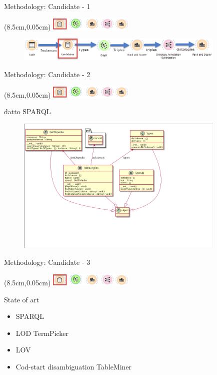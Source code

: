 \documentclass{beamer}
\begin{document}
\begin{frame}{Methodology: Candidate - 1}
	\begin{textblock*}{4cm}(8.5cm,0.05cm) %
		\includegraphics[width=4cm]{images/header-candidate.png}
	\end{textblock*}
	\begin{figure}
		\includegraphics[width=10cm]{images/diagrams-candidate.png}
	\end{figure}
\end{frame}
\begin{frame}{Methodology: Candidate - 2}
	\begin{textblock*}{4cm}(8.5cm,0.05cm) %
		\includegraphics[width=4cm]{images/header-candidate.png}
	\end{textblock*}
	\begin{definition}
		datto SPARQL
	\end{definition}
	\begin{figure}
		\includegraphics[width=10cm]{images/uml-types-diagram.png}
	\end{figure}
\end{frame}
\begin{frame}{Methodology: Candidate - 3}
	\begin{textblock*}{4cm}(8.5cm,0.05cm) %
		\includegraphics[width=4cm]{images/header-candidate.png}
	\end{textblock*}
	State of art
	\begin{itemize}
		\item SPARQL
		\item LOD TermPicker
		\item LOV
		\item Cod-start disambiguation TableMiner
	\end{itemize}
\end{frame}
\end{document}
